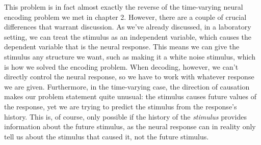 \documentclass{article}
\begin{document}
\begin{figure}[H]
    \centering

\end{figure}

This problem is in fact almost exactly the reverse of the time-varying neural encoding problem we met in chapter 2. However, there are a couple of crucial differences that warrant discussion. As we've already discussed, in a laboratory setting, we can treat the stimulus as an independent variable, which causes the dependent variable that is the neural response. This means we can give the stimulus any structure we want, such as making it a white noise stimulus, which is how we solved the encoding problem. When decoding, however, we can't directly control the neural response, so we have to work with whatever response we are given. Furthermore, in the time-varying case, the direction of causation makes our problem statement quite unusual: the stimulus causes future values of the response, yet we are trying to predict the stimulus from the response's history. This is, of course, only possible if the history of the \textit{stimulus} provides information about the future stimulus, as the neural response can in reality only tell us about the stimulus that caused it, not the future stimulus.\\
\end{document}
